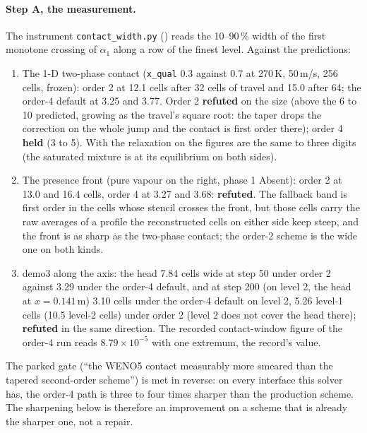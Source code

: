 \documentclass[11pt,a4paper]{article}
\newcommand{\code}[1]{\texttt{\small #1}}
\begin{document}
\paragraph{Step A, the measurement.}  The instrument
\code{contact\_width.py} () reads the
10--90\,\% width of the first monotone crossing of $\alpha_1$ along a
row of the finest level.  Against the predictions:
\begin{enumerate}[nosep]
\item The 1-D two-phase contact (\code{x\_qual} 0.3 against 0.7 at
      270\,K, 50\,m/s, 256 cells, frozen): order 2 at 12.1 cells after
      32 cells of travel and 15.0 after 64; the order-4 default at 3.25
      and 3.77.  Order 2 \textbf{refuted} on the size (above the 6 to 10
      predicted, growing as the travel's square root: the taper drops
      the correction on the whole jump and the contact is first order
      there); order 4 \textbf{held} (3 to 5).  With the relaxation on the
      figures are the same to three digits (the saturated mixture is at
      its equilibrium on both sides).
\item The presence front (pure vapour on the right, phase 1 Absent):
      order 2 at 13.0 and 16.4 cells, order 4 at 3.27 and 3.68:
      \textbf{refuted}.  The fallback band is first order in the cells
      whose stencil crosses the front, but those cells carry the raw
      averages of a profile the reconstructed cells on either side keep
      steep, and the front is as sharp as the two-phase contact; the
      order-2 scheme is the wide one on both kinds.
\item demo3 along the axis: the head 7.84 cells wide at step 50 under
      order 2 against 3.29 under the order-4 default, and at step 200
      (on level 2, the head at $x = 0.141$\,m) 3.10 cells under the order-4 default on level 2, 5.26 level-1 cells (10.5 level-2 cells) under order 2 (level 2 does not cover the head there);
      \textbf{refuted} in the same direction.  The recorded
      contact-window figure of the order-4 run reads $8.79\times10^{-5}$
      with one extremum, the record's value.
\end{enumerate}
The parked gate (``the WENO5 contact measurably more smeared than the
tapered second-order scheme'') is met in reverse: on every interface
this solver has, the order-4 path is three to four times sharper than
the production scheme.  The sharpening below is therefore an
improvement on a scheme that is already the sharper one, not a repair.
\end{document}
